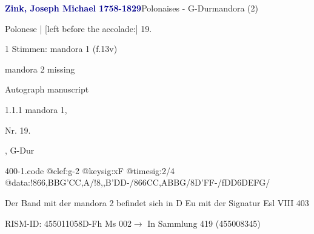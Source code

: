 \documentclass[twocolumn, 12pt]{book}
\begin{document}
\par \vspace{16pt} \textcolor{darkblue}{\textbf{Zink, Joseph Michael  1758-1829}}\hfillplus{\textbf{[400]}}\newline Polonaises - G-Dur\newline mandora (2)
\par \begin{itshape}[f.13v, at left:] Polonese | [left before the accolade:] 19.\end{itshape} 
\par \textcolor{darkblue}{}  1 Stimmen: mandora 1  (f.13v)\newline \begin{small} mandora 2 missing\end{small} \newline Autograph manuscript
\par 1.1.1  mandora 1, \begin{itshape}Nr. 19.\end{itshape}, G-Dur  
\begin{filecontents*}{400-1.code}
@clef:g-2
@keysig:xF
@timesig:2/4
@data:!866{,BBG}{'CC,A}/!8,,B'DD-/866{CC,A}{BBG}/8D'FF-/fDD6DEFG/
\end{filecontents*}
\newline %
\par Der Band mit der mandora 2 befindet sich in D Eu mit der Signatur Esl VIII 403
\par RISM-ID: 455011058\newline D-Fh  Ms 002\newline $\rightarrow$ In Sammlung 419 (455008345)
      
\end{document}
